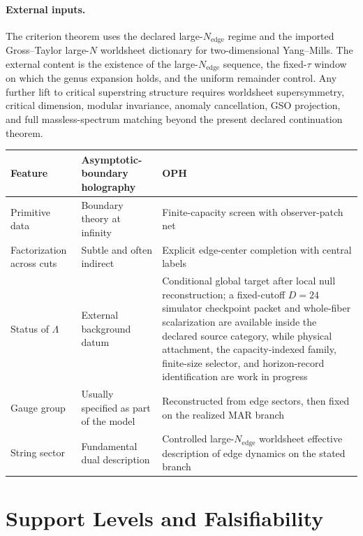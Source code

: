 \documentclass[11pt]{article}
\begin{document}
\paragraph{External inputs.}
The criterion theorem uses the declared large-\(N_{\mathrm{edge}}\) regime and the imported
Gross--Taylor large-\(N\) worldsheet dictionary for two-dimensional Yang--Mills. The external
content is the existence of the large-\(N_{\mathrm{edge}}\) sequence, the fixed-\(\tau\) window on
which the genus expansion holds, and the uniform remainder control. Any further lift to critical
superstring structure requires worldsheet supersymmetry, critical dimension, modular invariance,
anomaly cancellation, GSO projection, and full massless-spectrum matching beyond the present
declared continuation theorem.

\begingroup
\footnotesize
\begin{tabular}{@{}>{\raggedright\arraybackslash}p{}>{\raggedright\arraybackslash}p{}>{\raggedright\arraybackslash}p{}@{}}
\toprule
Feature & Asymptotic-boundary holography & OPH \\
\midrule
Primitive data & Boundary theory at infinity & Finite-capacity screen with observer-patch net \\
Factorization across cuts & Subtle and often indirect & Explicit edge-center completion with central labels \\
Status of $\Lambda$ & External background datum & Conditional global target after local null reconstruction; a fixed-cutoff \(D=24\) simulator checkpoint packet and whole-fiber scalarization are available inside the declared source category, while physical attachment, the capacity-indexed family, finite-size selector, and horizon-record identification are work in progress \\
Gauge group & Usually specified as part of the model & Reconstructed from edge sectors, then fixed on the realized MAR branch \\
String sector & Fundamental dual description & Controlled large-$N_{\mathrm{edge}}$ worldsheet effective description of edge dynamics on the stated branch \\
\bottomrule
\end{tabular}
\endgroup

\section{Support Levels and Falsifiability}\label{sec:claim-tiers}
\end{document}
